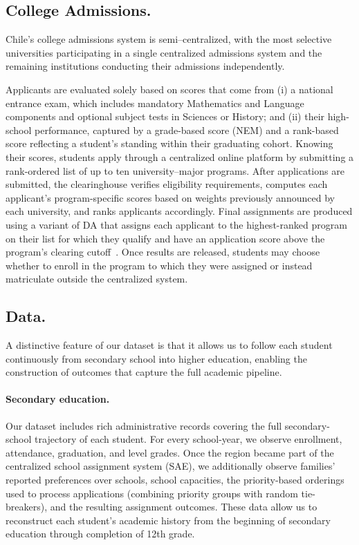 \subsection{College Admissions.} 
Chile's college admissions system is semi–centralized, with the most selective universities participating in a single centralized admissions system and the remaining institutions conducting their admissions independently. 

Applicants are evaluated solely based on scores that come from (i) a national entrance exam, which includes mandatory Mathematics and Language components and optional subject tests in Sciences or History; and (ii) their high-school performance, captured by a grade-based score (NEM) and a rank-based score reflecting a student's standing within their graduating cohort. Knowing their scores, students apply through a centralized online platform by submitting a rank-ordered list of up to ten university–major programs. After applications are submitted, the clearinghouse verifies eligibility requirements, computes each applicant's program-specific scores based on weights previously announced by each university, and ranks applicants accordingly.
Final assignments are produced using a variant of DA that assigns each applicant to the highest-ranked program on their list for which they qualify and have an application score above the program's clearing cutoff~\citep{rios2021}.
Once results are released, students may choose whether to enroll in the program to which they were assigned or instead matriculate outside the centralized system. 

\subsection{Data.} 
A distinctive feature of our dataset is that it allows us to follow each student continuously from secondary school into higher education, enabling the construction of outcomes that capture the full academic pipeline. 

\paragraph{Secondary education.} 
Our dataset includes rich administrative records covering the full secondary-school trajectory of each student. For every school-year, we observe enrollment, attendance, graduation, and level grades. Once the region became part of the centralized school assignment system (SAE), we additionally observe families' reported preferences over schools, school capacities, the priority-based orderings used to process applications (combining priority groups with random tie-breakers), and the resulting assignment outcomes. These data allow us to reconstruct each student's academic history from the beginning of secondary education through completion of 12th grade.


